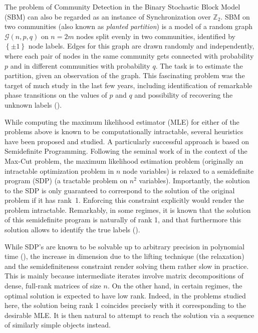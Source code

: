 \documentclass{colt2016} %
\newcommand{\1}{\mathbf{1}}
\newcommand{\ZZ}{\mathbb{Z}}
\newcommand{\GGG}{\mathcal{G}}
\begin{document}
The problem of Community Detection in the Binary Stochastic Block Model (SBM) can also be regarded as an instance of Synchronization over $\ZZ_2$. SBM on two communities (also known as \emph{planted partition}) is a model of a random graph $\GGG(n,p,q)$ on $n=2m$ nodes split evenly in two communities, identified by $\left\{\pm1\right\}$ node labels. Edges for this graph are drawn randomly and independently, where each pair of nodes in the same community gets connected with probability $p$ and in different communities with probability $q$. The task is to estimate the partition, given an observation of the graph. This fascinating problem was the target of much study in the last few years, including identification of remarkable phase transitions on the values of $p$ and $q$ and possibility of recovering the unknown labels (\cite{Decelle_SBM,Mossel_SBM1,Mossel_SBM2,Massoulie_SBM,abbe2014exact,Mossel_SBM3_exact}).


While computing the maximum likelihood estimator (MLE) for either of the problems above is known to be computationally intractable, several heuristics have been proposed and studied. A particularly successful approach is based on Semidefinite Programming. Following the seminal work of \cite{goemans1995maxcut} in the context of the Max-Cut problem, the maximum likelihood estimation problem (originally an intractable optimization problem in $n$ node variables) is relaxed to a semidefinite program (SDP) (a tractable problem on $n^2$ variables). Importantly, the solution to the SDP is only guaranteed to correspond to the solution of the original problem if it has rank~1. Enforcing this constraint explicitly would render the problem intractable. Remarkably, in some regimes, it is known that the solution of this semidefinite program is naturally of rank 1, and that furthermore this solution allows to identify the true labels (\cite{abbe2014decoding,bandeira2014tightness,abbe2014exact,bandeira2015laplacian,Hajek_et_al_SBM_SDP}).


While SDP's are known to be solvable up to arbitrary precision in polynomial time (\cite{nesterov2004introductory}), the increase in dimension due to the lifting technique (the relaxation) and the semidefiniteness constraint render solving them rather slow in practice. This is mainly because intermediate iterates involve matrix decompositions of dense, full-rank matrices of size $n$. On the other hand, in certain regimes, the optimal solution is expected to have low rank. Indeed, in the problems studied here, the solution being rank 1 coincides precisely with it corresponding to the desirable MLE. It is then natural to attempt to reach the solution via a sequence of similarly simple objects instead.
\end{document}
